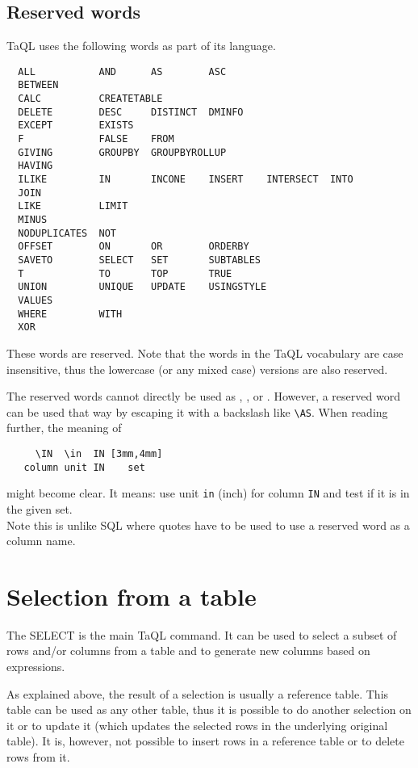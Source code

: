 \subsection{\label{TAQL:RESERVEDWORDS}Reserved words}
TaQL uses the following words as part of its language.
\begin{verbatim}
  ALL           AND      AS        ASC
  BETWEEN 
  CALC          CREATETABLE
  DELETE        DESC     DISTINCT  DMINFO
  EXCEPT        EXISTS
  F             FALSE    FROM
  GIVING        GROUPBY  GROUPBYROLLUP
  HAVING
  ILIKE         IN       INCONE    INSERT    INTERSECT  INTO
  JOIN
  LIKE          LIMIT
  MINUS
  NODUPLICATES  NOT
  OFFSET        ON       OR        ORDERBY
  SAVETO        SELECT   SET       SUBTABLES
  T             TO       TOP       TRUE
  UNION         UNIQUE   UPDATE    USINGSTYLE
  VALUES 
  WHERE         WITH
  XOR
\end{verbatim}
These words are reserved. Note that the words in the TaQL vocabulary
are case insensitive, 
thus the lowercase (or any mixed case) versions are also reserved.

The reserved words cannot directly be used as
,
, or 
.
However, a reserved word can be used that way by escaping it with a backslash like
\verb+\+\texttt{AS}. When reading further, the meaning of
\begin{verbatim}
     \IN  \in  IN [3mm,4mm]
   column unit IN    set
\end{verbatim}
might become clear. It means: use unit \texttt{in} (inch) for column
\texttt{IN} and test if it is in the given set. 
\\Note this is unlike SQL where quotes have to be used to use a
reserved word as a column name.

\section{Selection from a table}
The SELECT is the main TaQL command. It can be used to select a subset
of rows and/or columns from a table and to generate new columns based
on expressions.

As explained above, the result of a selection is usually a reference
table. This table can be used as any other table, thus it is possible
to do another selection on it or to update it (which updates the
selected rows in the underlying original table). It is, however, not possible to insert
rows in a reference table or to delete rows from it.

